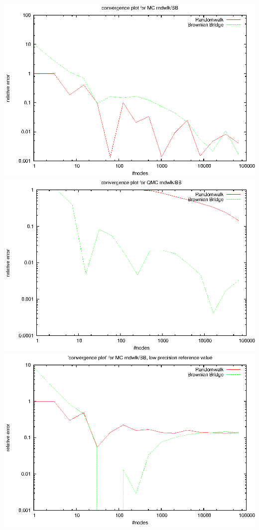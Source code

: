 \documentclass[]{article}
\begin{document}
\includegraphics[width=.9\textwidth]{task2_mc_high.eps}\\
\includegraphics[width=.9\textwidth]{task2_qmc.eps}\\
\includegraphics[width=.9\textwidth]{task2_mc_low.eps}\\
\end{document}
